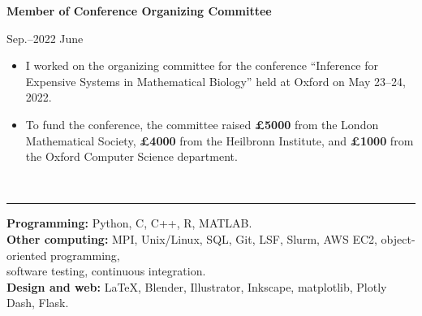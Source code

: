 \documentclass[11pt]{article}
\begin{document}
\vspace{0.2cm}


\noindent\parbox{.75\textwidth}{\raggedright \textbf{Member of Conference Organizing Committee\\ \vspace{.1cm}}}
\parbox{.25\textwidth}{ Sep.--2022 June}
\vspace{-.65cm}
\begin{itemize}
\setlength{\itemsep}{4pt}
\setlength{\parskip}{0pt}
\setlength{\parsep}{0pt}
\item I worked on the organizing committee for the conference ``Inference for Expensive Systems in Mathematical Biology'' held at Oxford on May 23--24, 2022.
\item To fund the conference, the committee raised \textbf{£5000} from the London Mathematical Society, \textbf{£4000} from the Heilbronn Institute, and \textbf{£1000} from the Oxford Computer Science department.
\end{itemize}


\vspace{.2cm}


\vspace{0.5cm}


\vspace{-2.75mm} \\
\rule{\textwidth}{0.4pt}
\vspace{0.1mm}
\textbf{Programming:} Python, C, C++, R, MATLAB.\\
\textbf{Other computing:} MPI, Unix/Linux, SQL, Git, LSF, Slurm, AWS EC2, object-oriented programming,\\
software testing, continuous integration. \\
\textbf{Design and web:} LaTeX, Blender, Illustrator, Inkscape, matplotlib, Plotly Dash, Flask.\\

\vspace{0.5cm}
\end{document}
